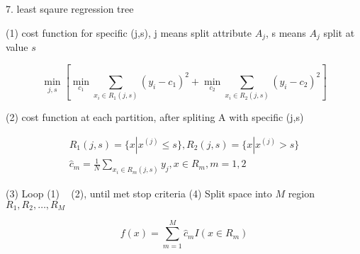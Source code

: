\documentclass[12pt]{article}
\begin{document}
\newpage

7. least sqaure regression tree



(1) cost function for specific (j,s), j means split attribute $A_j$, s means $A_j$ split at value $s$

   $$
   \min\limits_{j,s}\left[\min\limits_{c_1}\sum\limits_{x_i\in R_1(j,s)}(y_i-c_1)^2+\min\limits_{c_2}\sum\limits_{x_i\in R_2(j,s)}(y_i-c_2)^2\right]
   $$
   
(2) cost function at each partition, after spliting A with specific (j,s)

\begin{align*}
   R_1(j,s)=\{x|x^{(j)}\leq s\}, R_2(j,s)=\{x|x^{(j)}> s\} \\
   \hat{c}_m= \frac{1}{N}\sum\limits_{x_i\in R_m(j,s)} y_j, x\in R_m, m=1,2
\end{align*}

(3) Loop (1) ~ (2), until met stop criteria
(4) Split space into $M$ region $R_1, R_2, \dots, R_M$


   $$
   f(x)=\sum_{m=1}^M \hat{c}_mI(x\in R_m)
   $$
   
\end{document}

